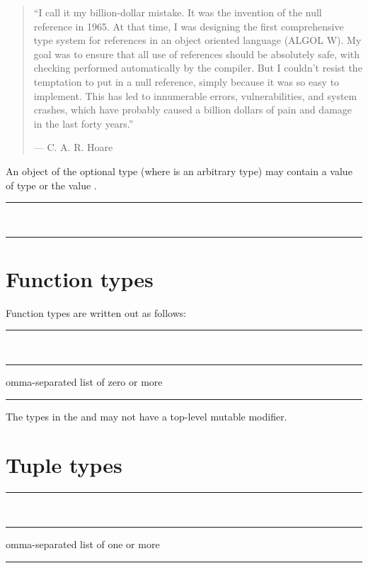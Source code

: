 \begin{quote}
``I call it my billion-dollar mistake. It was the invention of the null
reference in 1965. At that time, I was designing the first comprehensive type
system for references in an object oriented language (ALGOL W). My goal was to
ensure that all use of references should be absolutely safe, with checking
performed automatically by the compiler. But I couldn't resist the temptation to
put in a null reference, simply because it was so easy to implement. This has
led to innumerable errors, vulnerabilities, and system crashes, which have
probably caused a billion dollars of pain and damage in the last forty years.''

--- C. A. R. Hoare
\end{quote}

An object of the optional type  (where  is an arbitrary type)
may contain a value of type  or the value .

\begin{grammar}
\rule{optional-type}  \\
\rule{wrapped-type} 
\end{grammar}

\section{Function types}

Function types are written out as follows:

\begin{grammar}
\rule{function-type} \code{(}  \code{)} \code{->} \\
\rule{parameter-type-list} comma-separated list of zero or more \\
\rule{return-type} 
\end{grammar}

The types in the  and 
may not have a top-level mutable modifier.

\section{Tuple types}

\begin{grammar}
\rule{tuple-type} \code{(}  \code{)}\\
\rule{tuple-element-list} comma-separated list of one or more \\
\rule{tuple-element}  
\end{grammar}

